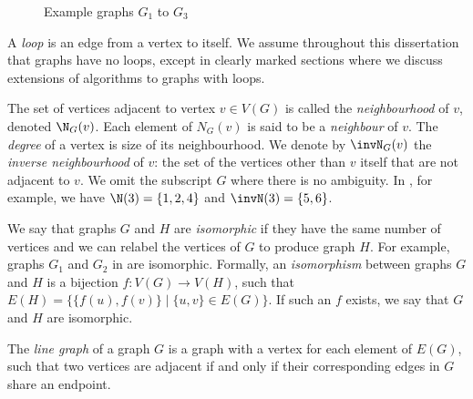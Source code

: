 \begin{figure}[htb]
{
        \label{fig:g3}
    }
    \caption{Example graphs $G_1$ to $G_3$}
    \label{fig:intro-examples}
\end{figure}

A \emph{loop} is an edge from a vertex to itself. We assume throughout this
dissertation that graphs have no loops, except in clearly marked sections where
we discuss extensions of algorithms to graphs with loops.

The set of vertices adjacent to vertex $v \in V(G)$
is called the \emph{neighbourhood} of $v$, denoted $\N_G(v)$.
Each element of $N_G(v)$ is said to be a \emph{neighbour} of $v$.
The \emph{degree} of a vertex is size of its neighbourhood.
We denote
by $\invN_G(v)$ the \emph{inverse neighbourhood} of $v$: the set
of the vertices other than $v$ itself that are not adjacent to $v$.
We omit the subscript $G$ where there is no ambiguity.
In , for example, we have $\N(3) = \{1,2,4\}$ and
$\invN(3) = \{5,6\}$.

We say that graphs $G$ and $H$ are \emph{isomorphic} if they have the same
number of vertices and we can relabel the vertices of $G$ to produce graph $H$.
For example, graphs $G_1$ and $G_2$ in  are
isomorphic.  Formally, an \emph{isomorphism} between graphs $G$ and $H$ is a
bijection $f:V(G)\rightarrow V(H)$, such that $E(H) = \{\{f(u), f(v)\} \mid \{u,
v\} \in E(G)\}$.  If such an $f$ exists, we say that $G$ and $H$ are
isomorphic.

The \emph{line graph} of a graph $G$ is a graph with a vertex for each element
of $E(G)$, such that two vertices are adjacent if and only if their corresponding edges
in $G$ share an endpoint.

